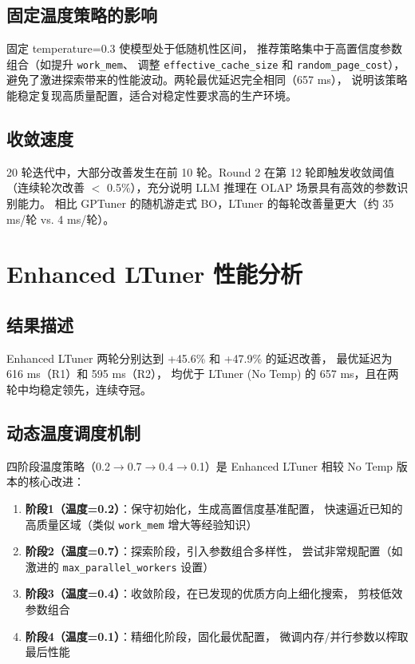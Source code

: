 \subsection{固定温度策略的影响}

固定 temperature=0.3 使模型处于低随机性区间，
推荐策略集中于高置信度参数组合（如提升 \texttt{work\_mem}、
调整 \texttt{effective\_cache\_size} 和 \texttt{random\_page\_cost}），
避免了激进探索带来的性能波动。两轮最优延迟完全相同（657 ms），
说明该策略能稳定复现高质量配置，适合对稳定性要求高的生产环境。

\subsection{收敛速度}

20 轮迭代中，大部分改善发生在前 10 轮。Round 2 在第 12 轮即触发收敛阈值
（连续轮次改善 $<$ 0.5\%），充分说明 LLM 推理在 OLAP 场景具有高效的参数识别能力。
相比 GPTuner 的随机游走式 BO，LTuner 的每轮改善量更大（约 35 ms/轮 vs. 4 ms/轮）。



\section{Enhanced LTuner 性能分析}

\subsection{结果描述}

Enhanced LTuner 两轮分别达到 +45.6\% 和 +47.9\% 的延迟改善，
最优延迟为 616 ms（R1）和 595 ms（R2），
均优于 LTuner (No Temp) 的 657 ms，且在两轮中均稳定领先，连续夺冠。

\subsection{动态温度调度机制}

四阶段温度策略（0.2$\to$0.7$\to$0.4$\to$0.1）是 Enhanced LTuner
相较 No Temp 版本的核心改进：

\begin{enumerate}
  \item \textbf{阶段1（温度=0.2）}：保守初始化，生成高置信度基准配置，
        快速逼近已知的高质量区域（类似 \texttt{work\_mem} 增大等经验知识）
  \item \textbf{阶段2（温度=0.7）}：探索阶段，引入参数组合多样性，
        尝试非常规配置（如激进的 \texttt{max\_parallel\_workers} 设置）
  \item \textbf{阶段3（温度=0.4）}：收敛阶段，在已发现的优质方向上细化搜索，
        剪枝低效参数组合
  \item \textbf{阶段4（温度=0.1）}：精细化阶段，固化最优配置，
        微调内存/并行参数以榨取最后性能
\end{enumerate}

